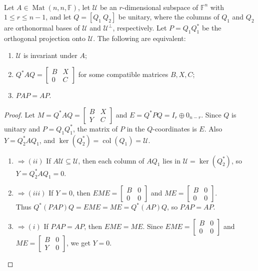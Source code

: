 \begin{theorem} \label{thm:matrix-invariant-subspace-projection-block-criteria} \\
Let $A\in\operatorname{Mat}(n,n,\mathbb{F})$, let $\mathcal{U}$ be an $r$-dimensional subspace of $\mathbb{F}^n$ with $1\leq r\leq n-1$, and let $Q=[Q_1\ Q_2]$ be unitary, where the columns of $Q_1$ and $Q_2$ are orthonormal bases of $\mathcal{U}$ and $\mathcal{U}^{\perp}$, respectively. Let $P=Q_1Q_1^*$ be the orthogonal projection onto $\mathcal{U}$. The following are equivalent:
\begin{enumerate}[label=(\roman*)]
\setlength{\itemsep}{0pt}
\item $\mathcal{U}$ is invariant under $A$;
\item $Q^*AQ=\begin{bmatrix}B & X\\ 0 & C\end{bmatrix}$ for some compatible matrices $B,X,C$;
\item $PAP=AP$.
\end{enumerate}
\begin{proof} Let $M=Q^*AQ=\begin{bmatrix}B&X\\Y&C\end{bmatrix}$ and $E=Q^*PQ=I_r\oplus0_{n-r}$. Since $Q$ is unitary and $P=Q_1Q_1^*$, the matrix of $P$ in the $Q$-coordinates is $E$. Also $Y=Q_2^*AQ_1$, and $\ker(Q_2^*)=\operatorname{col}(Q_1)=\mathcal{U}$.
\begin{enumerate}[label=(\roman*).]
\setlength{\itemsep}{0pt}
\item[$(i)$] $\Rightarrow (ii)$ If $A\mathcal{U}\subseteq\mathcal{U}$, then each column of $AQ_1$ lies in $\mathcal{U}=\ker(Q_2^*)$, so $Y=Q_2^*AQ_1=0$.
\item[$(ii)$] $\Rightarrow (iii)$ If $Y=0$, then $EME=\begin{bmatrix}B&0\\0&0\end{bmatrix}$ and $ME=\begin{bmatrix}B&0\\0&0\end{bmatrix}$.\\
Thus $Q^*(PAP)Q=EME=ME=Q^*(AP)Q$, so $PAP=AP$.
\item[$(iii)$] $\Rightarrow (i)$ If $PAP=AP$, then $EME=ME$. Since $EME=\begin{bmatrix}B&0\\0&0\end{bmatrix}$ and $ME=\begin{bmatrix}B&0\\Y&0\end{bmatrix}$, we get $Y=0$.\\

\end{enumerate}
\end{proof}
\end{theorem}
